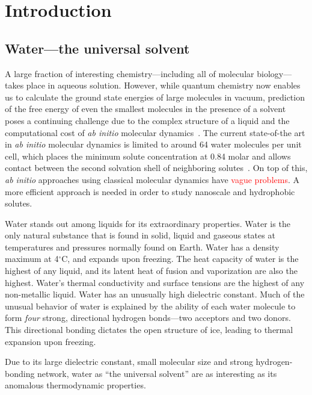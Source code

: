 \documentclass[letterpaper,twocolumn,amsmath,amssymb,prb]{revtex4-1}
\begin{document}
\section{Introduction}

\subsection{Water---the universal solvent}

A large fraction of interesting chemistry---including all of molecular
biology---takes place in aqueous solution.  However, while quantum
chemistry now enables us to calculate the ground state energies of
large molecules in vacuum, prediction of the free energy of even the
smallest molecules in the presence of a solvent poses a continuing
challenge due to the complex structure of a liquid and the
computational cost of \emph{ab initio} molecular
dynamics~\cite{car1985, grossman2004}.  The current state-of-the art
in \emph{ab initio} molecular dynamics is limited to around 64 water
molecules per unit cell, which places the minimum solute concentration
at 0.84 molar and allows contact between the second solvation shell of
neighboring solutes~\cite{izvekov2005, choe2007}.  On top of this,
\emph{ab initio} approaches using classical molecular dynamics have
\textcolor{red}{vague problems}\cite{weber2010ab-initio-water}.  A
more efficient approach is needed in order to study nanoscale and
hydrophobic solutes.

Water stands out among liquids for its extraordinary properties.  Water is
the only natural substance that is found in solid, liquid and gaseous
states at temperatures and pressures normally found on Earth.  Water has a
density maximum at 4$^\circ$C, and expands upon freezing.  The heat
capacity of water is the highest of any liquid, and its latent heat of
fusion and vaporization are also the highest.  Water's thermal conductivity
and surface tensions are the highest of any non-metallic liquid.  Water has
an unusually high dielectric constant.
Much of the unusual behavior of water is explained by the ability of each
water molecule to form \emph{four} strong, directional hydrogen bonds---two
acceptors and two donors.  This directional bonding dictates the open
structure of ice, leading to thermal expansion upon freezing.

Due to its large dielectric constant, small molecular size and strong
hydrogen-bonding network, water as ``the universal solvent'' are as
interesting as its anomalous thermodynamic properties.
\end{document}
